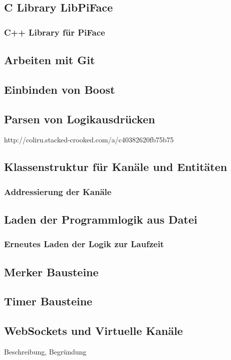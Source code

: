 

\renewcommand{\pthImg}{\pthUmsetzung/img}
\renewcommand{\pthDoc}{\pthUmsetzung/doc}

\subsection{C Library LibPiFace}

\subsubsection{C++ Library für PiFace}

\subsection{Arbeiten mit Git}

\subsection{Einbinden von Boost}

\subsection{Parsen von Logikausdrücken}

http://coliru.stacked-crooked.com/a/c40382620fb75b75

\subsection{Klassenstruktur für Kanäle und Entitäten}
\subsubsection{Addressierung der Kanäle}

\subsection{Laden der Programmlogik aus Datei}
\subsubsection{Erneutes Laden der Logik zur Laufzeit}
\subsection{Merker Bausteine}
\subsection{Timer Bausteine}
\subsection{WebSockets und Virtuelle Kanäle}


Beschreibung, Begründung

